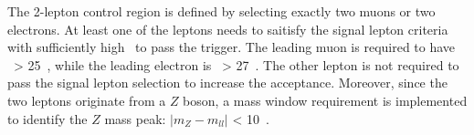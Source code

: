 \par The 2-lepton control region is defined by selecting exactly two muons or two electrons. 
At least one of the leptons needs to saitisfy the signal lepton criteria with sufficiently high \pt~to pass the trigger. 
The leading muon is required to have \pt~> 25~\GeV, while the leading electron is \pt~> 27~\GeV. 
The other lepton is not required to pass the signal lepton selection to increase the acceptance. 
Moreover, since the two leptons originate from a $Z$ boson, a mass window requirement is implemented to identify the $Z$ mass peak: $|m_{Z}-m_{ll}|$ < 10~\GeV.
